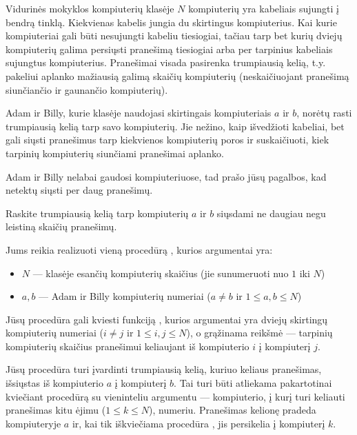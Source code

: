 \documentclass{boi2014-lt}
\begin{document}
    Vidurinės mokyklos kompiuterių klasėje $N$ kompiuterių yra kabeliais
    sujungti į bendrą tinklą. Kiekvienas kabelis jungia du skirtingus
    kompiuterius. Kai kurie kompiuteriai gali būti nesujungti kabeliu
    tiesiogiai, tačiau tarp bet kurių dviejų kompiuterių galima persiųsti
    pranešimą tiesiogiai arba per tarpinius kabeliais sujungtus kompiuterius.
    Pranešimai visada pasirenka trumpiausią kelią, t.y. pakeliui aplanko
    mažiausią galimą skaičių kompiuterių (neskaičiuojant pranešimą siunčiančio
    ir gaunančio kompiuterių).
    
    Adam ir Billy, kurie klasėje naudojasi skirtingais kompiuteriais $a$ ir $b$,
    norėtų rasti trumpiausią kelią tarp savo kompiuterių. Jie nežino, kaip
    išvedžioti kabeliai, bet gali siųsti pranešimus tarp kiekvienos
    kompiuterių poros ir suskaičiuoti, kiek tarpinių kompiuterių siunčiami
    pranešimai aplanko.
    
    Adam ir Billy nelabai gaudosi kompiuteriuose, tad prašo jūsų pagalbos, kad
    netektų siųsti per daug pranešimų.

    \Task
    Raskite trumpiausią kelią tarp kompiuterių $a$ ir $b$ siųsdami ne daugiau
    negu leistiną skaičių pranešimų.

    \Implementation
    Jums reikia realizuoti vieną procedūrą , kurios argumentai yra:

    \begin{itemize}
        \item $N$ --- klasėje esančių kompiuterių skaičius
            (jie sunumeruoti nuo $1$ iki $N$)
        \item $a, b$ --- Adam ir Billy kompiuterių numeriai
            ($a \neq b$ ir $1 \le a, b \le N$)
    \end{itemize}

    Jūsų procedūra  gali kviesti funkciją ,
    kurios argumentai yra dviejų skirtingų kompiuterių numeriai
    ($i \neq j$ ir $1 \le i, j \le N$), o grąžinama reikšmė --- tarpinių
    kompiuterių skaičius pranešimui keliaujant iš kompiuterio $i$ į
    kompiuterį $j$.

    Jūsų procedūra  turi įvardinti trumpiausią kelią, kuriuo
    keliaus pranešimas, išsiųstas iš kompiuterio $a$ į kompiuterį $b$. Tai
    turi būti atliekama pakartotinai kviečiant procedūrą  su
    vieninteliu argumentu --- kompiuterio, į kurį turi keliauti
    pranešimas kitu ėjimu ($1 \le k \le N$), numeriu. Pranešimas kelionę pradeda
    kompiuteryje $a$ ir, kai tik iškviečiama procedūra , jis
    persikelia į kompiuterį $k$.
\end{document}
